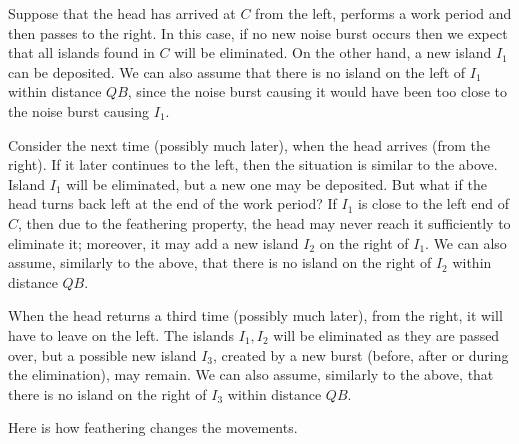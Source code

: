 \documentclass[12pt]{memoir}
\def\B{B}
\begin{document}
\begin{example}[3 islands]\label{xmp:3-islands}
  Suppose that the head has arrived at \( C \) from the left,
performs a work period and then passes to the right.
In this case, if no new noise burst occurs then we expect that
all islands found in \( C \) will be eliminated.
On the other hand, a new island \( I_{1} \) can be deposited.
We can also assume that there is no island on the left of  \( I_{1} \) 
within distance \( Q\B \), since the noise burst
causing it would have been too close to the noise burst causing \( I_{1} \).

Consider the next time (possibly much later), when the head arrives (from the right).
If it later continues to the left, then the situation is similar to the above.
Island \( I_{1} \) will be eliminated, but a new one may be deposited.
But what if the head turns back left at the end of the work period?
If \( I_{1} \) is close to the left end of \( C \), then due to the feathering
property, the head may never reach it sufficiently to eliminate it; moreover,
it may add a new island \( I_{2} \) on the right of \( I_{1} \).
We can also assume, similarly to the above, 
that there is no island on the right of  \( I_{2} \) within distance \( Q\B \).

When the head returns a third time (possibly much later), 
from the right, it will have to leave on the left.
The islands \( I_{1},I_{2} \) will be eliminated as they are passed over, 
but a possible new island
\( I_{3} \), created by a new burst (before, after or during the elimination), may remain.
We can also assume, similarly to the above, 
that there is no island on the right of  \( I_{3} \) within distance \( Q\B \).
\end{example}

Here is how feathering changes the movements.
\end{document}
